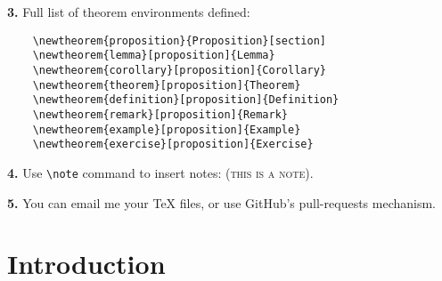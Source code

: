 \documentclass[letterpaper,11pt,oneside,reqno]{amsart}
\numberwithin{equation}{section}
\newcommand{\note}[1]{\textsc{\color{blue}(#1)}}
\theoremstyle{definition}
\begin{document}
\textbf{3.} Full list of theorem environments defined:
\begin{lstlisting}
	\newtheorem{proposition}{Proposition}[section]
	\newtheorem{lemma}[proposition]{Lemma}
	\newtheorem{corollary}[proposition]{Corollary}
	\newtheorem{theorem}[proposition]{Theorem}
	\newtheorem{definition}[proposition]{Definition}
	\newtheorem{remark}[proposition]{Remark}
	\newtheorem{example}[proposition]{Example}
	\newtheorem{exercise}[proposition]{Exercise}	
\end{lstlisting}

\textbf{4.} Use \lstinline{\note} command to insert notes: \note{this is a note}.

\textbf{5.} You can email me your \TeX{} files, or use GitHub's pull-requests mechanism.


\section{Introduction} %
\label{sec:introduction}










\end{document}
